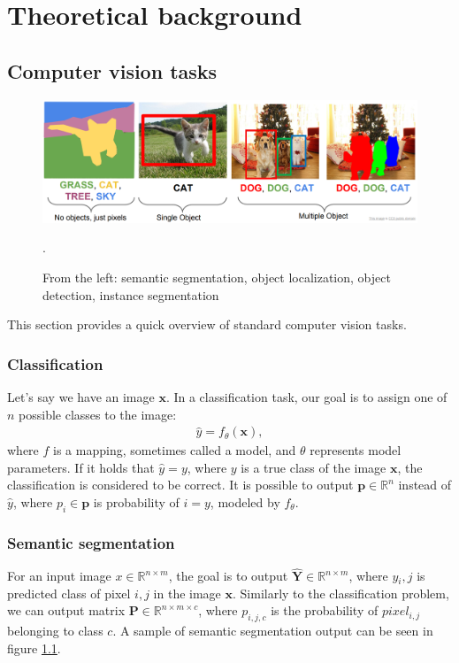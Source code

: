 \chapter{Theoretical background}
\section{Computer vision tasks}
\begin{figure}
    \centering
    \includegraphics[width=\linewidth]{images/computer_vision_tasks.png}
    \caption{From the left: semantic segmentation, object localization, object detection, instance segmentation}.
    \label{fig:computer_vision_tasks}
\end{figure}
This section provides a quick overview of standard computer vision tasks.
\subsection{Classification}
Let's say we have an image $\mathbf{x}$. In a classification task, our goal is to assign one of $n$ possible classes to the image:
\begin{align}
    \hat{y} = f_\theta\left(\mathbf{x} \right),
\end{align}
where $f$ is a mapping, sometimes called a model, and $\theta$  represents model parameters. If it holds that $\hat{y}=y$, where $y$ is a true class of the image $\mathbf{x}$, the classification is considered to be correct.
It is possible to output $\mathbf{p} \in \mathbb{R}^n$ instead of $\hat{y}$, where $p_i \in \mathbf{p}$ is probability of $i = y$, modeled by $f_\theta$.

\subsection{Semantic segmentation}
For an input image $x \in \mathbb{R}^{n \times m}$, the goal is to output $\mathbf{\hat{Y}} \in \mathbb{R}^{n \times m}$, where $y{_i,j}$ is predicted class of pixel $i,j$ in the image $\mathbf{x}$. Similarly to the classification problem, we can output matrix $\mathbf{P} \in \mathbb{R}^{n \times m \times c}$, where $p_{i,j,c}$ is the probability of $pixel_{i,j}$ belonging to class $c$. A sample of semantic segmentation output can be seen in figure \ref{fig:computer_vision_tasks}.

